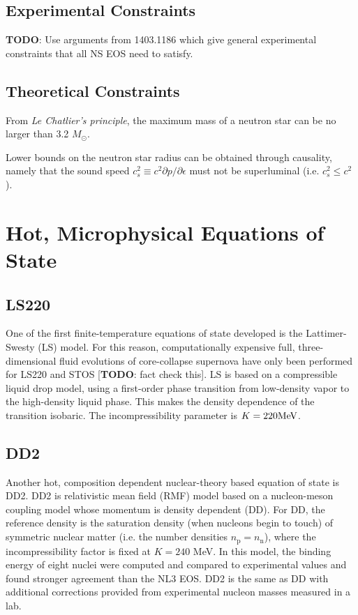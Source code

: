 \subsection{Experimental Constraints}

\textbf{TODO}: Use arguments from 1403.1186 which give general experimental constraints that all NS EOS need to satisfy. 

\subsection{Theoretical Constraints}

From \textit{Le Chatlier's principle}, the maximum mass of a neutron star can be no larger than 3.2 $M_\odot$.  

Lower bounds on the neutron star radius can be obtained through causality, namely that the sound speed $c_s^2 \equiv c^2 \partial p / \partial \epsilon$ must not be superluminal (i.e. $c_s^2 \le c^2$).

\section{Hot, Microphysical Equations of State}
\label{sec:nuclear-eos}

\subsection{LS220}
\label{sec:ls220}

One of the first finite-temperature equations of state developed is the Lattimer-Swesty (LS) model.  For this reason, computationally expensive full, three-dimensional fluid evolutions of core-collapse supernova have only been performed for LS220 and STOS [\textbf{TODO}: fact check this].
LS is based on a compressible liquid drop model, using a first-order phase transition from low-density vapor to the high-density liquid phase.  This makes the density dependence of the transition isobaric.  The incompressibility parameter is $K = 220 {\rm MeV}$.

\subsection{DD2}
\label{sec:dd2}

Another hot, composition dependent nuclear-theory based equation of state is DD2.  DD2 is relativistic mean field (RMF) model based on a nucleon-meson coupling model whose momentum is density dependent (DD).  
For DD, the reference density is the saturation density (when nucleons begin to touch) of symmetric nuclear matter (i.e. the number densities $n_\textrm{p} = n_\textrm{n}$), where the incompressibility factor is fixed at $K = 240$ MeV.
In this model, the binding energy of eight nuclei were computed and compared to experimental values and found stronger agreement than the NL3 EOS.
DD2 is the same as DD with additional corrections provided from experimental nucleon masses measured in a lab.

